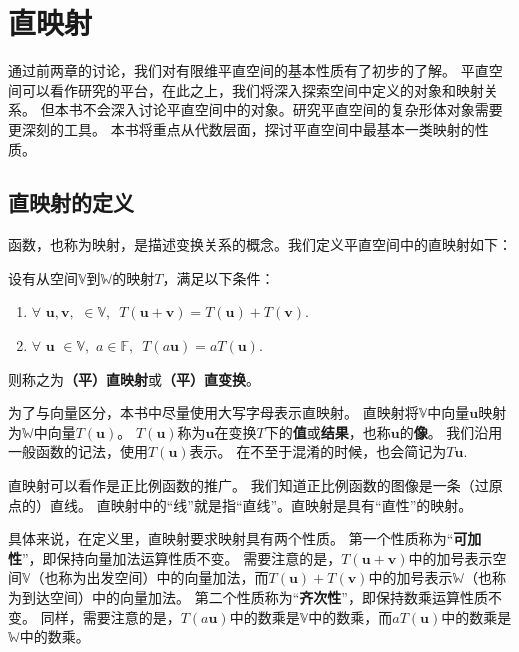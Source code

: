 \documentclass[12pt,UTF8]{ctexbook}
\begin{document}
\chapter{直映射}

通过前两章的讨论，我们对有限维平直空间的基本性质有了初步的了解。
平直空间可以看作研究的平台，在此之上，我们将深入探索空间中定义的对象和映射关系。
但本书不会深入讨论平直空间中的对象。研究平直空间的复杂形体对象需要更深刻的工具。
本书将重点从代数层面，探讨平直空间中最基本一类映射的性质。

\begin{center}
\end{center}

\section{直映射的定义}
函数，也称为映射，是描述变换关系的概念。我们定义平直空间中的直映射如下：
\begin{df}\label{df:3_1}
    设有从空间$\mathbb{V}$到$\mathbb{W}$的映射$T$，满足以下条件：
    \begin{enumerate}
        \item $\forall \,\, \mathbf{u} , \mathbf{v} , \,\, \in \mathbb{V}, \,\,\, T(\mathbf{u} + \mathbf{v}) = T(\mathbf{u}) + T(\mathbf{v}). $
        \item $\forall \,\, \mathbf{u} \,\, \in \mathbb{V}, \,\, a \in \mathbb{F}, \,\,\, T(a\mathbf{u}) = aT(\mathbf{u}). $
    \end{enumerate}
    则称之为{\bfseries （平）直映射}或{\bfseries （平）直变换}。
\end{df}
为了与向量区分，本书中尽量使用大写字母表示直映射。
直映射将$\mathbb{V}$中向量$\mathbf{u}$映射为$\mathbb{W}$中向量$T(\mathbf{u})$。
$T(\mathbf{u})$称为$\mathbf{u}$在变换$T$下的\textbf{值}或\textbf{结果}，也称$\mathbf{u}$的\textbf{像}。
我们沿用一般函数的记法，使用$T(\mathbf{u})$表示。
在不至于混淆的时候，也会简记为$T\mathbf{u}$.

直映射可以看作是正比例函数的推广。
我们知道正比例函数的图像是一条（过原点的）直线。
直映射中的“线”就是指“直线”。直映射是具有“直性”的映射。

具体来说，在定义里，直映射要求映射具有两个性质。
第一个性质称为“{\bfseries 可加性}”，即保持向量加法运算性质不变。
需要注意的是，$T(\mathbf{u} + \mathbf{v})$中的加号表示空间$\mathbb{V}$（也称为出发空间）中的向量加法，而$T(\mathbf{u}) + T(\mathbf{v})$中的加号表示$\mathbb{W}$（也称为到达空间）中的向量加法。
第二个性质称为“{\bfseries 齐次性}”，即保持数乘运算性质不变。
同样，需要注意的是，$T(a\mathbf{u})$中的数乘是$\mathbb{V}$中的数乘，而$aT(\mathbf{u})$中的数乘是$\mathbb{W}$中的数乘。
\end{document}
